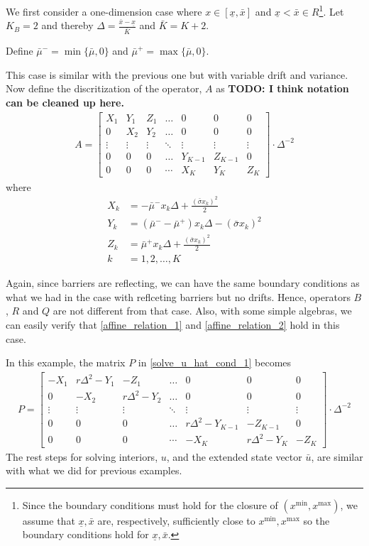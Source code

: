 \documentclass[11pt]{article}
\begin{document}
We first consider a one-dimension case where $x\in [\underline{\textit{\~{x}}}, \bar{\textit{\~{x}}}]$ and $\underline{\textit{\~{x}}} < \bar{\textit{\~{x}}} \in R$\footnote{Since the boundary conditions must hold for the closure of $(x^{\min},x^{\max})$, we assume that $\underline{\textit{\~{x}}}, \bar{\textit{\~{x}}}$ are, respectively, sufficiently close to $x^{\min}, x^{\max}$ so the boundary conditions hold for $\underline{\textit{\~{x}}}, \bar{\textit{\~{x}}}$.}. Let $K_B = 2$ and thereby $\Delta  = \frac{\bar{\textit{\~{x}}} - \underline{\textit{\~{x}}}}{\bar{K}}$ and $\bar{K} = K+2$.

Define $\bar{\mu}^- = \min\{\bar{\mu}, 0\}$ and $\bar{\mu}^+  = \max\{\bar{\mu}, 0\}$.

This case is similar with the previous one but with variable drift and variance. Now define the discritization of the operator, $A$ as \textbf{TODO: I think notation can be cleaned up here.}
\begin{align}
A = \begin{bmatrix}
X_1&Y_1&Z_1&\dots&0&0&0\\
0&X_2&Y_2&\dots&0&0&0\\
\vdots&\vdots&\vdots&\ddots&\vdots&\vdots&\vdots\\
0&0&0&\dots&Y_{K-1}&Z_{K-1}&0\\
0&0&0&\cdots&X_{K}&Y_{K}&Z_{K}
\end{bmatrix}\cdot \Delta^{-2}
\end{align}
where
\begin{align*}
X_k &= -\bar{\mu}^-x_k\Delta+\frac{(\bar{\sigma}x_k)^2}{2}\\
Y_k &= (\bar{\mu}^--\bar{\mu}^+)x_k\Delta-(\bar{\sigma}x_k)^2\\
Z_k &=\bar{\mu}^+x_k\Delta+\frac{(\bar{\sigma}x_k)^2}{2}\\
k & = 1, 2,\dots, K
\end{align*}

Again, since barriers are reflecting, we can have the same boundary conditions as what we had in the case with reflceting barriers but no drifts. Hence, operators $B$, $R$ and $Q$ are not different from that case. Also, with some simple algebras, we can easily verify that \eqref{affine_relation_1} and \eqref{affine_relation_2} hold in this case.

In this example, the matrix $P$ in \eqref{solve_u_hat_cond_1} becomes
\begin{align}
P = \begin{bmatrix}
-X_1&r\Delta^2-Y_1&-Z_1&\dots&0&0&0\\
0&-X_2&r\Delta^2-Y_2&\dots&0&0&0\\
\vdots&\vdots&\vdots&\ddots&\vdots&\vdots&\vdots\\
0&0&0&\dots&r\Delta^2-Y_{K-1}&-Z_{K-1}&0\\
0&0&0&\cdots&-X_K&r\Delta^2-Y_K&-Z_K
\end{bmatrix}\cdot \Delta^{-2}
\end{align}
The rest steps for solving interiors, $u$, and the extended state vector $\bar{u}$, are similar with what we did for previous examples.
\end{document}
